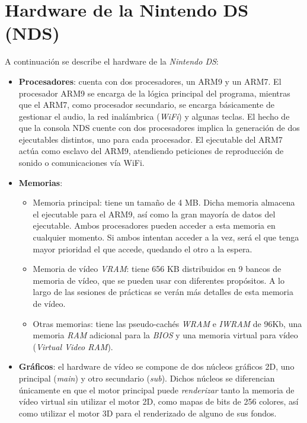 \section{Hardware de la Nintendo DS (NDS)}

A continuación se describe el hardware de la \textit{Nintendo DS}:

\begin{itemize}
\item \textbf{Procesadores}: cuenta con dos procesadores, un ARM9 y un ARM7. El procesador ARM9 se encarga de la	lógica principal del programa, mientras que el ARM7, como procesador secundario, se encarga básicamente de gestionar el audio, la red inalámbrica (\textit{WiFi}) y algunas teclas. El hecho de que la consola NDS cuente con dos procesadores implica	la generación de dos ejecutables distintos, uno para cada procesador. El ejecutable del ARM7 actúa como esclavo del ARM9, atendiendo peticiones de reproducción de sonido o comunicaciones vía WiFi.
%	
\item \textbf{Memorias}:
	\begin{itemize}
	\item Memoria principal: tiene un tamaño de 4 MB. Dicha	memoria almacena el ejecutable para el ARM9, así como la gran mayoría de datos del ejecutable. Ambos procesadores pueden acceder a esta memoria en cualquier momento. Si ambos intentan acceder a la vez, será el que tenga mayor prioridad el que accede, quedando el otro a la espera.
	\item Memoria de vídeo \textit{VRAM}: tiene  656 KB  distribuidos en  9 bancos de memoria de vídeo, que se pueden usar con diferentes propósitos. A lo largo de las sesiones de prácticas se verán más detalles de esta memoria de vídeo.
	\item Otras memorias: tiene las pseudo-cachés \textit{WRAM} e \textit{IWRAM} de 96Kb, una memoria \textit{RAM} adicional para la \textit{BIOS} y una memoria virtual para vídeo (\textit{Virtual Video RAM}). 
	\end{itemize}
%
\item \textbf{Gráficos}: el hardware de vídeo se compone de dos núcleos gráficos 2D, uno	principal (\textit{main}) y otro secundario (\textit{sub}). Dichos núcleos se diferencian únicamente en que el motor principal puede \textit{renderizar} tanto la memoria de vídeo virtual sin utilizar el motor 2D, como mapas de bits de 256 colores, así como utilizar el motor 3D para el renderizado de alguno de sus fondos.

\end{itemize}
